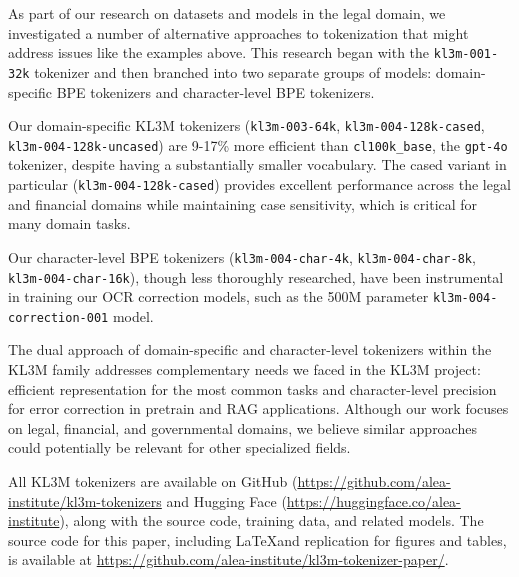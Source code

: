 As part of our research on datasets and models in the legal domain, we investigated a number of alternative approaches to tokenization that might address issues like the examples above.  This research began with the \texttt{kl3m-001-32k} tokenizer and then branched into two separate groups of models: domain-specific BPE tokenizers and character-level BPE tokenizers.  

Our domain-specific KL3M tokenizers (\texttt{kl3m-003-64k}, \texttt{kl3m-004-128k-cased}, \texttt{kl3m-004-128k-uncased}) are 9-17\% more efficient than \texttt{cl100k\_base}, the \texttt{gpt-4o} tokenizer, despite having a substantially smaller vocabulary. The cased variant in particular (\texttt{kl3m-004-128k-cased}) provides excellent performance across the legal and financial domains while maintaining case sensitivity, which is critical for many domain tasks.

Our character-level BPE tokenizers (\texttt{kl3m-004-char-4k}, \texttt{kl3m-004-char-8k}, \texttt{kl3m-004-char-16k}), though less thoroughly researched, have been instrumental in training our OCR correction models, such as the 500M parameter \texttt{kl3m-004-correction-001} model.

The dual approach of domain-specific and character-level tokenizers within the KL3M family addresses complementary needs we faced in the KL3M project: efficient representation for the most common tasks and character-level precision for error correction in pretrain and RAG applications. Although our work focuses on legal, financial, and governmental domains, we believe similar approaches could potentially be relevant for other specialized fields. 

All KL3M tokenizers are available on GitHub (\url{https://github.com/alea-institute/kl3m-tokenizers} and Hugging Face (\url{https://huggingface.co/alea-institute}), along with the source code, training data, and related models.  The source code for this paper, including \LaTeX and replication for figures and tables, is available at \url{https://github.com/alea-institute/kl3m-tokenizer-paper/}.
